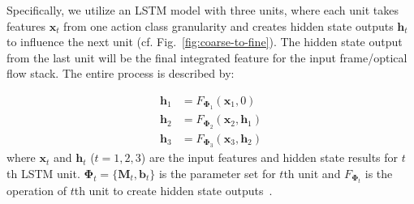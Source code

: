 \documentclass[letterpaper]{article} %
\begin{document}


Specifically, we utilize an LSTM model with three units, where each unit takes features $\mathbf{x}_{t}$ from one action class granularity and creates hidden state outputs $\mathbf{h}_{t}$ to influence the next unit (cf. Fig.~\ref{fig:coarse-to-fine}). The hidden state output from the last unit will be the final integrated feature for the input frame/optical flow stack. The entire process is described by: %

\begin{equation}
\begin{aligned}
\mathbf{h}_{1}&={F}_{\mathbf{\Phi}_1}\left ( \mathbf{x}_{1}, 0 \right )
\\\mathbf{h}_{2}&={F}_{\mathbf{\Phi}_2}\left ( \mathbf{x}_{2},\mathbf{h}_{1} \right )
\\\mathbf{h}_{3}&={F}_{\mathbf{\Phi}_3}\left ( \mathbf{x}_{3},\mathbf{h}_{2} \right )
\end{aligned}
\label{equation:equ2}
\end{equation}
where $\mathbf{x}_{t}$ and $\mathbf{h}_{t}$ ($t=1,2,3$) are the input features and hidden state results for $t$th LSTM unit. $\mathbf{\Phi}_t=\{\mathbf{M}_t, \mathbf{b}_t\}$ is the parameter set for $t$th unit and ${F}_{\mathbf{\Phi}_t}$ is the operation of $t$th unit to create hidden state outputs~\cite{LSTM}.  %
\end{document}
